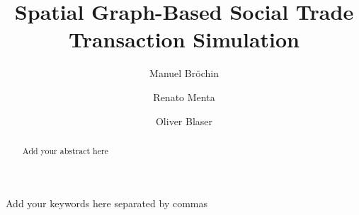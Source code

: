 \documentclass{JASSS}
\title{Spatial Graph-Based Social Trade\\ Transaction Simulation}
\author[1]{Manuel Bröchin}
\affil[1]{Head of the SMABSAC Boiz}
\author[2]{Renato Menta}
\affil[2]{Second Hand}
\author[3]{Oliver Blaser}
\affil[3]{hallo}
\begin{document}
\maketitle 



\begin{abstract}
Add your abstract here
\end{abstract}

\begin{keywords}
Add your keywords here separated by commas
\end{keywords}

\parano{}






\end{document}
